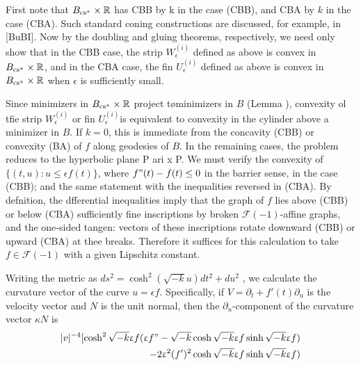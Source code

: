  First note that ${B_{\cs\kappa}}\times\R$  has CBB by k in the case (CBB), and CBA
by $k$ in the case (CBA). Such standard coning constructions are discussed,
for example, in [BuBI]. Now by the doubling and gluing theorems, 
respectively, we need only show that in the CBB case, the strip $W_\epsilon^{(i)}$   defined as above is convex in ${B_{\cs\kappa}}\times \R$, and in the CBA case, the fin $U_\epsilon^{(i)}$ defined as above is convex in $ {B_{\cs\kappa}}\times \R$   
when $\epsilon$ is sufficiently small.

Since minimizers in ${B_{\cs\kappa}}\times\R$ project t\o minimizers in $B$ (Lemma ),                                                                                                                                                                                                                                                                                                                                                                                             
convexity ol tfie strip $W_\epsilon^{(i)}$ or fin $U_\epsilon^{(i)}$is equivalent to convexity in the
cylinder above a minimizer in $B$. If $k = 0$, this is immediate from the
concavity (CBB) or convexity (BA) of $f$ along geodesies of $B$. In the
remaining cases, the problem reduces to the hyperbolic plane P ari x P.
We must verify the convexity of $\{(t, u) : u \le \epsilon f(t)\}$, where $f"(t)- f(t) \le 0$
in the barrier sense, in the case (CBB); and the same statement with the
inequalities reversed in (CBA). By defnition, the dfferential inequalities
imply that the graph of $f$ lies above (CBB) or below (CBA) sufficiently
fine inscriptions by broken $\mathcal{F}(-1)$-affine graphs, and the one-sided tangen:
vectors of these inscriptions rotate downward (CBB) or upward (CBA) at thee breaks. Therefore it suffices for this calculation to take  $f\in \mathcal{F}(-1)$
with a given Lipschitz constant.

Writing the metric as $ds^2   = \cosh^2 (\sqrt{-k}u)dt^2 + du^2$ , we calculate the
curvature vector of the curve $u = \epsilon f$. Specifically, if $V = \partial_t + f'(t)\partial_u$ is
the velocity vector and $N$ is the unit normal, then the $\partial_u$-component of the
curvature vector $\kappa N$ is
\begin{eqnarray}
|v|^{-4}    [\cosh^2 \sqrt{-k}\epsilon f (\epsilon f"- \sqrt{-k}\cosh    \sqrt{-k}\epsilon f \sinh\sqrt{-k} \epsilon f) \nonumber \\
- 2\epsilon^2(f')^2\cosh    \sqrt{-k}\epsilon f \sinh\sqrt{-k} \epsilon f) 
\end{eqnarray}


